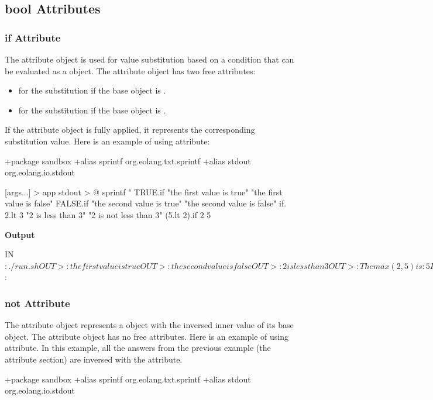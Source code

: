 \documentclass[12pt]{book}
\begin{document}
{\subsection{bool Attributes}

\subsubsection{if Attribute}
The  attribute object is used for value substitution based on a condition that can be evaluated as a  object.
The  attribute object has two free attributes:
\begin{itemize}
    \item {} for the substitution if the base  object is .
    \item {} for the substitution if the base  object is .
\end{itemize}
If the  attribute object is fully applied, it represents the corresponding substitution value. Here is an example of using  attribute:
\begin{ffcode}
+package sandbox
+alias sprintf org.eolang.txt.sprintf
+alias stdout org.eolang.io.stdout

[args...] > app
  stdout > @
    sprintf
      "%
      TRUE.if
        "the first value is true"
        "the first value is false"
      FALSE.if
        "the second value is true"
        "the second value is false"
      if.
        2.lt 3
        "2 is less than 3"
        "2 is not less than 3"
      (5.lt 2).if
        2
        5
\end{ffcode}
\textbf{Output}
\begin{ffcode}
IN$: ./run.sh
OUT>: the first value is true
OUT>: the second value is false
OUT>: 2 is less than 3
OUT>: The max(2, 5) is: 5
IN$: 
\end{ffcode}

\subsubsection{not Attribute}
The  attribute object represents a  object with the inversed inner value of its base  object.
The  attribute object has no free attributes. Here is an example of using  attribute.
In this example, all the answers from the previous example (the  attribute section) are inversed with the  attribute.

\begin{ffcode}
+package sandbox
+alias sprintf org.eolang.txt.sprintf
+alias stdout org.eolang.io.stdout


\end{ffcode}}
\end{document}
